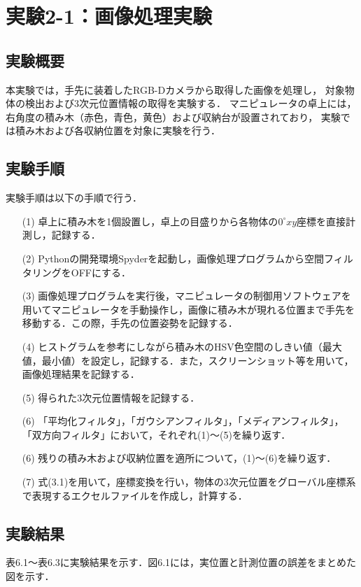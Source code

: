 
\section{実験2-1：画像処理実験}

\subsection{実験概要}
本実験では，手先に装着したRGB-Dカメラから取得した画像を処理し，
対象物体の検出および3次元位置情報の取得を実験する．
マニピュレータの卓上には，右角度の積み木（赤色，青色，黄色）および収納台が設置されており，
実験では積み木および各収納位置を対象に実験を行う．

\subsection{実験手順}
実験手順は以下の手順で行う．

\begin{enumerate}
  \item[(1)] 卓上に積み木を1個設置し，卓上の目盛りから各物体の$0^{\circ}xy$座標を直接計測し，記録する．
  \item[(2)] Pythonの開発環境Spyderを起動し，画像処理プログラムから空間フィルタリングをOFFにする．
  \item[(3)] 画像処理プログラムを実行後，マニピュレータの制御用ソフトウェアを用いてマニピュレータを手動操作し，画像に積み木が現れる位置まで手先を移動する．この際，手先の位置姿勢を記録する．
  \item[(4)] ヒストグラムを参考にしながら積み木のHSV色空間のしきい値（最大値，最小値）を設定し，記録する．また，スクリーンショット等を用いて，画像処理結果を記録する．
  \item[(5)] 得られた3次元位置情報を記録する．
  \item[(6)] 「平均化フィルタ」，「ガウシアンフィルタ」，「メディアンフィルタ」，「双方向フィルタ」において，それぞれ(1)～(5)を繰り返す．
  \item[(6)] 残りの積み木および収納位置を適所について，(1)～(6)を繰り返す．
  \item[(7)] 式(3.1)を用いて，座標変換を行い，物体の3次元位置をグローバル座標系で表現するエクセルファイルを作成し，計算する．
\end{enumerate}

\subsection{実験結果}
表6.1～表6.3に実験結果を示す．図6.1には，実位置と計測位置の誤差をまとめた図を示す．


